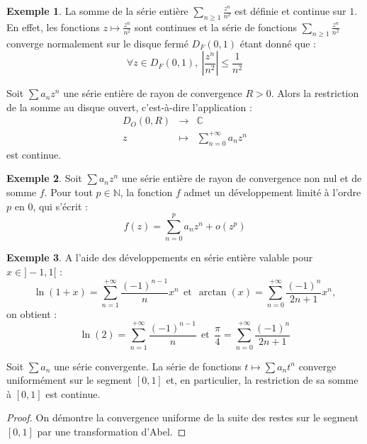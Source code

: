 \documentclass[french]{article}
\newcommand{\N}{\mathbb{N}}
\newcommand{\C}{\mathbb{C}}
\theoremstyle{plain}
\theoremstyle{definition}
\newtheorem*{ex}{Exemple}
\theoremstyle{remark}
\begin{document}
\begin{ex}
	La somme de la série entière $\displaystyle\sum_{n\geqslant 1}\frac{z^n}{n^2}$ est définie et continue sur $1$. En effet, les fonctions $z\mapsto\displaystyle\frac{z^n}{n^2}$ sont continues et la série de fonctions $\displaystyle\sum_{n\geqslant 1}\frac{z^n}{n^2}$ converge normalement sur le disque fermé $D_F(0,1)$ étant donné que : $$\forall z\in D_F(0,1),\ \left\lvert\frac{z^n}{n^2}\right\rvert\leqslant\frac{1}{n^2}$$
\end{ex}

\begin{cor}%
	Soit $\displaystyle\sum a_n z^n$ une série entière de rayon de convergence $R>0$. Alors la restriction de la somme au disque ouvert, c'est-à-dire l'application : $$\begin{array}{rcl}
		D_O(0,R)&\longrightarrow&\C\\
		z&\longmapsto&\displaystyle\sum_{n=0}^{+\infty} a_nz^n
	\end{array}$$ est continue.
\end{cor}

\begin{ex}
	Soit $\displaystyle\sum a_nz^n$ une série entière de rayon de convergence non nul et de somme $f$. Pour tout $p\in\N$, la fonction $f$ admet un développement limité à l'ordre $p$ en $0$, qui s'écrit : $$f(z)=\sum_{n=0}^{p}a_nz^n+o(z^p)$$
\end{ex}

\begin{ex}%
	A l'aide des développements en série entière valable pour $x\in]-1,1[$ : $$\ln(1+x)=\sum_{n=1}^{+\infty}\frac{(-1)^{n-1}}{n}x^n\ \ \text{et}\ \ \arctan(x)=\sum_{n=0}^{+\infty}\frac{(-1)^n}{2n+1}x^n,$$ on obtient : $$\ln(2)=\sum_{n=1}^{+\infty}\frac{(-1)^{n-1}}{n}\ \ \text{et}\ \ \frac{\pi}{4}=\sum_{n=0}^{+\infty}\frac{(-1)^n}{2n+1}$$
\end{ex}

\begin{lem}%
	Soit $\displaystyle\sum a_n$ une série convergente. La série de fonctions $t\mapsto\displaystyle\sum a_nt^n$ converge uniformément sur le segment $[0,1]$ et, en particulier, la restriction de sa somme à $[0,1]$ est continue.
\end{lem}
\begin{proof}
	On démontre la convergence uniforme de la suite des restes sur le segment $[0,1]$ par une transformation d'Abel.
\end{proof}
\end{document}
